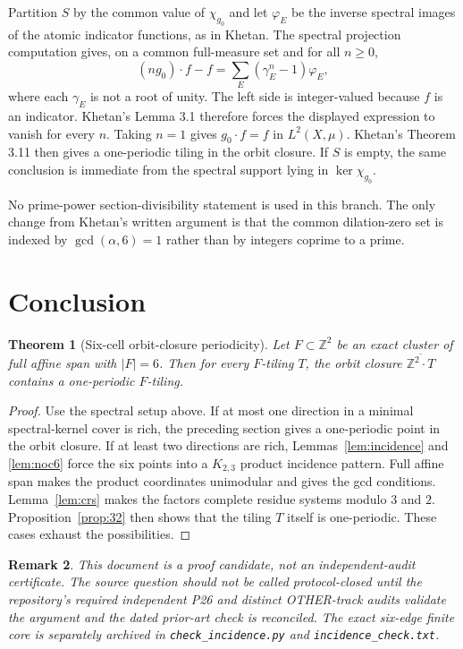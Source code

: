 \documentclass[11pt]{article}
\newtheorem{theorem}{Theorem}
\newtheorem{remark}[theorem]{Remark}
\newcommand{\Z}{\mathbb Z}
\begin{document}
Partition $S$ by the common value of $\chi_{g_0}$ and let $\varphi_E$ be the inverse spectral images of the atomic indicator functions, as in Khetan. The spectral projection computation gives, on a common full-measure set and for all $n\ge0$,
\[
 (ng_0)\cdot f-f
 =\sum_E(\gamma_E^n-1)\varphi_E,
\]
where each $\gamma_E$ is not a root of unity. The left side is integer-valued because $f$ is an indicator. Khetan's Lemma 3.1 therefore forces the displayed expression to vanish for every $n$. Taking $n=1$ gives $g_0\cdot f=f$ in $L^2(X,\mu)$. Khetan's Theorem 3.11 then gives a one-periodic tiling in the orbit closure. If $S$ is empty, the same conclusion is immediate from the spectral support lying in $\ker\chi_{g_0}$.

No prime-power section-divisibility statement is used in this branch. The only change from Khetan's written argument is that the common dilation-zero set is indexed by $\gcd(\alpha,6)=1$ rather than by integers coprime to a prime.

\section{Conclusion}
\begin{theorem}[Six-cell orbit-closure periodicity]\label{thm:main}
Let $F\subset\Z^2$ be an exact cluster of full affine span with $|F|=6$. Then for every $F$-tiling $T$, the orbit closure $\overline{\Z^2\cdot T}$ contains a one-periodic $F$-tiling.
\end{theorem}
\begin{proof}
Use the spectral setup above. If at most one direction in a minimal spectral-kernel cover is rich, the preceding section gives a one-periodic point in the orbit closure. If at least two directions are rich, Lemmas~\ref{lem:incidence} and \ref{lem:noc6} force the six points into a $K_{2,3}$ product incidence pattern. Full affine span makes the product coordinates unimodular and gives the gcd conditions. Lemma~\ref{lem:crs} makes the factors complete residue systems modulo $3$ and $2$. Proposition~\ref{prop:32} then shows that the tiling $T$ itself is one-periodic. These cases exhaust the possibilities.
\end{proof}

\begin{remark}
This document is a proof candidate, not an independent-audit certificate. The source question should not be called protocol-closed until the repository's required independent P26 and distinct OTHER-track audits validate the argument and the dated prior-art check is reconciled. The exact six-edge finite core is separately archived in \texttt{check\_incidence.py} and \texttt{incidence\_check.txt}.
\end{remark}
\end{document}
